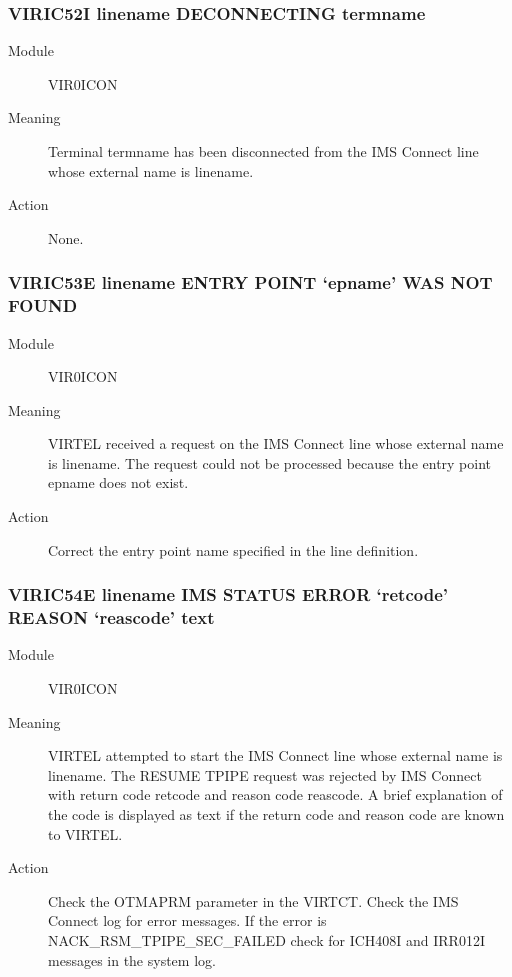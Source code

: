 \documentclass[letterpaper,10pt,english]{sphinxmanual}
\begin{document}
\subsubsection{VIRIC52I linename DECONNECTING termname}
\label{\detokenize{messages:viric52i-linename-deconnecting-termname}}\begin{description}
\item[{Module}] \leavevmode
VIR0ICON

\item[{Meaning}] \leavevmode
Terminal termname has been disconnected from the IMS Connect line whose external name is linename.

\item[{Action}] \leavevmode
None.

\end{description}


\subsubsection{VIRIC53E linename ENTRY POINT ‘epname’ WAS NOT FOUND}
\label{\detokenize{messages:viric53e-linename-entry-point-epname-was-not-found}}\begin{description}
\item[{Module}] \leavevmode
VIR0ICON

\item[{Meaning}] \leavevmode
VIRTEL received a request on the IMS Connect line whose external name is linename. The request could not be processed because the entry point epname does not exist.

\item[{Action}] \leavevmode
Correct the entry point name specified in the line definition.

\end{description}


\subsubsection{VIRIC54E linename IMS STATUS ERROR ‘retcode’ REASON ‘reascode’ text}
\label{\detokenize{messages:viric54e-linename-ims-status-error-retcode-reason-reascode-text}}\begin{description}
\item[{Module}] \leavevmode
VIR0ICON

\item[{Meaning}] \leavevmode
VIRTEL attempted to start the IMS Connect line whose external name is linename. The RESUME TPIPE request was rejected by IMS Connect with return code retcode and reason code reascode. A brief explanation of the code is displayed as text if the return code and reason code are known to VIRTEL.

\item[{Action}] \leavevmode
Check the OTMAPRM parameter in the VIRTCT. Check the IMS Connect log for error messages. If the error is NACK\_RSM\_TPIPE\_SEC\_FAILED check for ICH408I and IRR012I messages in the system log.

\end{description}
\end{document}

